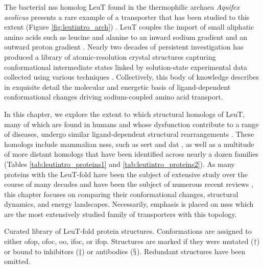 The bacterial \gls{nss} homolog LeuT found in the thermophilic archaea \emph{Aquifex aeolicus} presents a rare example of a transporter that has been studied to this extent (Figure \ref{fig:leutintro_arch}) \citep*{Yamashita2005}. LeuT couples the import of small aliphatic amino acids such as leucine and alanine to an inward sodium gradient and an outward proton gradient \citep*{Zhao2010}. Nearly two decades of persistent investigation has produced a library of atomic-resolution crystal structures capturing conformational intermediate states \citep*{Fan2021, Gotfryd2020, Krishnamurthy2012, Malinauskaite2016, Singh2008, Yamashita2005} linked by solution-state experimental data collected using various techniques \citep*{Adhikary2017, Billesbølle2015, Billesbølle2016, Claxton2010, Kazmier2014a, Merkle2018, Zhao2011}. Collectively, this body of knowledge describes in exquisite detail the molecular and energetic basis of ligand-dependent conformational changes driving sodium-coupled amino acid transport.

In this chapter, we explore the extent to which structural homologs of LeuT, many of which are found in humans and whose dysfunction contribute to a range of diseases, undergo similar ligand-dependent structural rearrangements \citep*{Loland2015}. These homologs include mammalian \gls{nss}s, such as \gls{sert} and \gls{dat} \citep*{Beuming2006, Coleman2016, Penmatsa2013}, as well as a multitude of more distant homologs that have been identified across nearly a dozen families (Tables \ref{tab:leutintro_proteins1} and \ref{tab:leutintro_proteins2}). As many proteins with the LeuT-fold have been the subject of extensive study over the course of many decades and have been the subject of numerous recent reviews \citep*{Bozzi2021, Cheng2019, Chew2021,  ErrastiMurugarren2021, Henriquez2021, Krammer2019, Patching2018, Rudnick2019, Singh2018, Ziegler2010}, this chapter focuses on comparing their conformational changes, structural dynamics, and energy landscapes. Necessarily, emphasis is placed on \gls{nss}s which are the most extensively studied family of transporters with this topology.

\begin{table}[h!]
\scriptsize
\renewcommand{\tabcolsep}{0.09cm}
\centering
\caption[Curated library of LeuT-fold protein structures.]{Curated library of LeuT-fold protein structures. Conformations are assigned to either \gls{ofop}, \gls{ofoc}, \gls{oo}, \gls{ifoc}, or \gls{ifop}. Structures are marked if they were mutated ($\dagger$) or bound to inhibitors ($\ddagger$) or antibodies ($\mathsection$). Redundant structures have been omitted.}

\label{tab:leutintro_proteins1}
\end{table}

